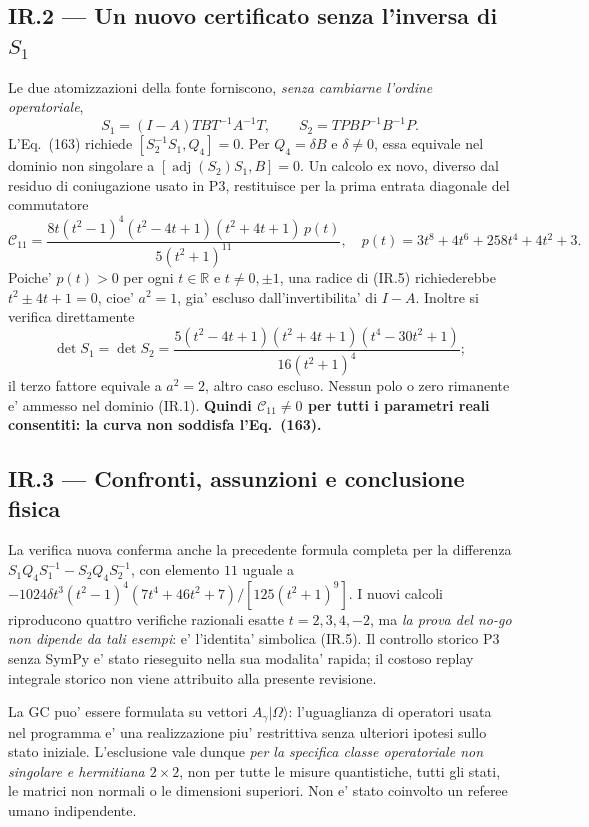 \documentclass[11pt,a4paper]{article}
\begin{document}
\subsection*{IR.2 --- Un nuovo certificato senza l'inversa di $S_1$}
Le due atomizzazioni della fonte forniscono, \emph{senza cambiarne l'ordine operatoriale},
\begin{equation}
 S_1=(I-A)TB T^{-1}A^{-1}T,\qquad
 S_2=TPB P^{-1}B^{-1}P.\tag{IR.4}
\end{equation}
L'Eq.~(163) richiede $[S_2^{-1}S_1,Q_4]=0$. Per $Q_4=\delta B$ e $\delta\ne0$, essa equivale nel dominio non singolare a $[\operatorname{adj}(S_2)S_1,B]=0$. Un calcolo ex novo, diverso dal residuo di coniugazione usato in P3, restituisce per la prima entrata diagonale del commutatore
\begin{equation}
\boxed{\mathcal C_{11}=\frac{8t(t^2-1)^4(t^2-4t+1)(t^2+4t+1)\,p(t)}{5(t^2+1)^{11}}},
\quad p(t)=3t^8+4t^6+258t^4+4t^2+3.\tag{IR.5}
\end{equation}
Poiche' $p(t)>0$ per ogni $t\in\mathbb R$ e $t\ne0,\pm1$, una radice di (IR.5) richiederebbe $t^2\pm4t+1=0$, cioe' $a^2=1$, gia' escluso dall'invertibilita' di $I-A$. Inoltre si verifica direttamente
\begin{equation}
\det S_1=\det S_2=\frac{5(t^2-4t+1)(t^2+4t+1)(t^4-30t^2+1)}{16(t^2+1)^4};\tag{IR.6}
\end{equation}
il terzo fattore equivale a $a^2=2$, altro caso escluso. Nessun polo o zero rimanente e' ammesso nel dominio (IR.1). \textbf{Quindi $\mathcal C_{11}\ne0$ per tutti i parametri reali consentiti: la curva non soddisfa l'Eq.~(163).}

\subsection*{IR.3 --- Confronti, assunzioni e conclusione fisica}
La verifica nuova conferma anche la precedente formula completa per la differenza $S_1Q_4S_1^{-1}-S_2Q_4S_2^{-1}$, con elemento $11$ uguale a $-1024\delta t^3(t^2-1)^4(7t^4+46t^2+7)/[125(t^2+1)^9]$. I nuovi calcoli riproducono quattro verifiche razionali esatte $t=2,3,4,-2$, ma \emph{la prova del no-go non dipende da tali esempi}: e' l'identita' simbolica (IR.5). Il controllo storico P3 senza SymPy e' stato rieseguito nella sua modalita' rapida; il costoso replay integrale storico non viene attribuito alla presente revisione.

La GC puo' essere formulata su vettori $A_\gamma|\Omega\rangle$: l'uguaglianza di operatori usata nel programma e' una realizzazione piu' restrittiva senza ulteriori ipotesi sullo stato iniziale. L'esclusione vale dunque \emph{per la specifica classe operatoriale non singolare e hermitiana $2\times2$}, non per tutte le misure quantistiche, tutti gli stati, le matrici non normali o le dimensioni superiori. Non e' stato coinvolto un referee umano indipendente.
\end{document}
